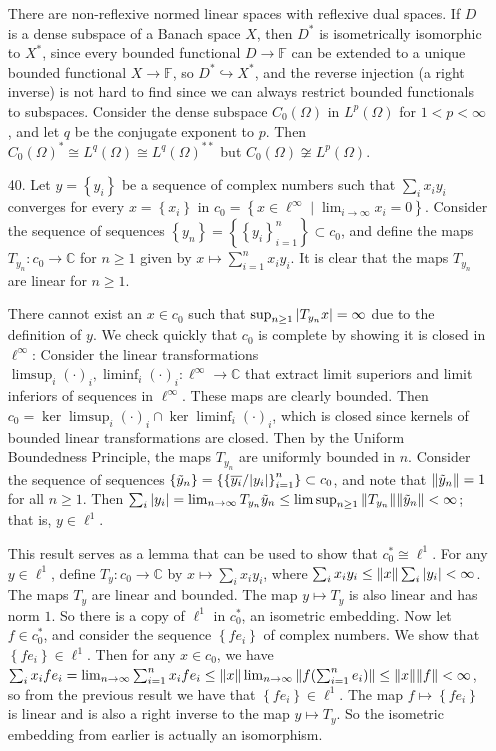 \documentclass[11pt,leqno]{article}
\theoremstyle{plain}
\theoremstyle{definition}
\numberwithin{equation}{section}
\numberwithin{lem}{section}
\newcommand{\cbr}[1]{\left\{#1\right\}}
\begin{document}
\begin{enumerate}
  There are non-reflexive normed linear spaces with reflexive dual spaces. If $D$ is a dense subspace of a Banach space $X$, then $D^\ast $ is isometrically isomorphic to $ X^\ast$, since every bounded functional $D\to \mathbb F$ can be extended to a unique bounded functional $X\to \mathbb F$, so $D^\ast\hookrightarrow X^\ast$, and the reverse injection (a right inverse) is not hard to find since we can always restrict bounded functionals to subspaces.
  Consider the dense subspace $C_0(\Omega)$ in $L^p(\Omega)$ for $1<p<\infty$, and let $q$ be the conjugate exponent to $p$. Then $C_0(\Omega)^\ast\cong L^q(\Omega)\cong L^q(\Omega)^{\ast\ast}$ but $C_0(\Omega)\not\cong L^p(\Omega)$.
  
  \item[40.] Let $y = \cbr{y_i}$ be a sequence of complex numbers such that $\sum_ix_iy_i$ converges for every $x = \cbr{x_i}$ in $c_0 = \cbr{x\in \ell^\infty\mid \lim_{i\to\infty}x_i = 0}$. Consider the sequence of sequences $\cbr{y_n} = \cbr{\cbr{y_i}_{i=1}^n}\subset c_0$, and define the maps $T_{y_n}\colon c_0\to\mathbb C$ for $n\geq 1$ given by $x\mapsto \sum_{i=1}^nx_iy_i$. It is clear that the maps $T_{y_n}$ are linear for $n\geq 1$.
  
  There cannot exist an $x\in c_0$ such that $\sup_{n\geq 1}\abs{T_{y_n}x} = \infty$ due to the definition of $y$. We check quickly that $c_0$ is complete by showing it is closed in $\ell^\infty$: Consider the linear transformations $\limsup_i(\cdot)_i,\liminf_i(\cdot)_i\colon \ell^\infty\to\mathbb C$ that extract limit superiors and limit inferiors of sequences in $\ell^\infty$. These maps are clearly bounded. Then $c_0 = \ker\limsup_i(\cdot)_i\cap\ker \liminf_i(\cdot)_i$, which is closed since kernels of bounded linear transformations are closed. Then by the Uniform Boundedness Principle, the maps $T_{y_n}$ are uniformly bounded in $n$. Consider the sequence of sequences  $\cbr{\tilde y_n} = \cbr{\cbr{\overline{y_i}/\abs{y_i}}_{i=1}^n}\subset c_0$, and note that $\norm{\tilde y_n} = 1$ for all $n\geq 1$. Then $\sum_i \abs{y_i} = \lim_{n\to\infty}T_{y_n}\tilde y_n\leq \limsup_{n\geq 1}\norm{T_{y_n}}\norm{\tilde y_n} < \infty$; that is, $y\in \ell^1$.

  This result serves as a lemma that can be used to show that $c_0^\ast \cong \ell^1$. For any $y\in \ell^1$, define $T_y\colon c_0\to\mathbb C$ by $x\mapsto \sum_i x_iy_i$, where $\sum_i x_iy_i\leq \norm{x}\sum_i\abs{y_i}<\infty$. The maps $T_y$ are linear and bounded. The map $y\mapsto T_y$ is also linear and has norm $1$. So there is a copy of $\ell^1$ in $c_0^\ast$, an isometric embedding. Now let $f\in c_0^\ast$, and consider the sequence $\cbr{fe_i}$ of complex numbers. We show that $\cbr{fe_i}\in\ell^1$. Then for any $x\in c_0$, we have $\sum_ix_ife_i = \lim_{n\to\infty}\sum_{i=1}^nx_ife_i\leq \norm{x}\lim_{n\to\infty}\norm{f(\sum_{i=1}^ne_i)}\leq \norm{x}\norm{f} < \infty$, so from the previous result we have that $\cbr{fe_i}\in \ell^1$. The map $f\mapsto \cbr{fe_i}$ is linear and is also a right inverse to the map $y\mapsto T_y$. So the isometric embedding from earlier is actually an isomorphism.
  

\end{enumerate}
\end{document}
